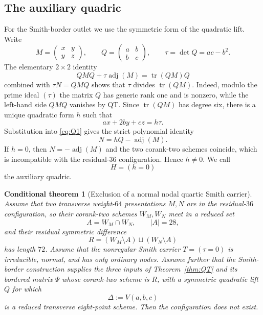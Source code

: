 \documentclass[11pt,reqno]{amsart}
\newtheorem{conditional}[theorem]{Conditional theorem}
\theoremstyle{remark}
\newcommand{\adj}{\operatorname{adj}}
\begin{document}
\subsection{The auxiliary quadric}
For the Smith-border outlet we use the symmetric form of the quadratic lift.  Write
\[
M=\begin{pmatrix}x&y\\y&z\end{pmatrix},
\qquad
Q=\begin{pmatrix}a&b\\b&c\end{pmatrix},
\qquad
\tau=\det Q=ac-b^2.
\]
The elementary $2\times2$ identity
\[
QMQ+\tau\adj(M)=\operatorname{tr}(QM)Q \tag{Q1}\label{eq:Q1}
\]
combined with $\tau N=QMQ$ shows that $\tau$ divides $\operatorname{tr}(QM)$.  Indeed, modulo the prime ideal $(\tau)$ the matrix $Q$ has generic rank one and is nonzero, while the left-hand side $QMQ$ vanishes by QT.  Since $\operatorname{tr}(QM)$ has degree six, there is a unique quadratic form $h$ such that
\[
ax+2by+cz=h\tau. \tag{Q2}\label{eq:Q2}
\]
Substitution into \eqref{eq:Q1} gives the strict polynomial identity
\[
N=hQ-\adj(M). \tag{Q3}\label{eq:Q3}
\]
If $h=0$, then $N=-\adj(M)$ and the two corank-two schemes coincide, which is incompatible with the residual-$36$ configuration.  Hence $h\ne0$.  We call
\[
H=(h=0)
\]
the auxiliary quadric.

\begin{conditional}[Exclusion of a normal nodal quartic Smith carrier]\label{thm:smith}
Assume that two transverse weight-$64$ presentations $M,N$ are in the residual-$36$ configuration, so their corank-two schemes $W_M,W_N$ meet in a reduced set
\[
A=W_M\cap W_N,
\qquad |A|=28,
\]
and their residual symmetric difference
\[
R=(W_M\setminus A)\sqcup(W_N\setminus A)
\]
has length $72$.  Assume that the nonregular Smith carrier $T=(\tau=0)$ is irreducible, normal, and has only ordinary nodes.  Assume further that the Smith-border construction supplies the three inputs of Theorem~\ref{thm:QT} and its bordered matrix $\Psi$ whose corank-two scheme is $R$, with a symmetric quadratic lift $Q$ for which
\[
\Delta:=V(a,b,c)
\]
is a reduced transverse eight-point scheme.  Then the configuration does not exist.
\end{conditional}
\end{document}
